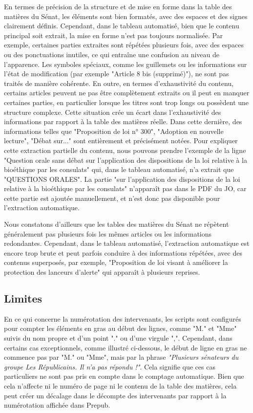 En termes de précision de la structure et de mise en forme dans la table des matières du Sénat, les éléments sont bien formatés, avec des espaces et des signes clairement définis. Cependant, dans le tableau automatisé, bien que le contenu principal soit extrait, la mise en forme n'est pas toujours normalisée. Par exemple, certaines parties extraites sont répétées plusieurs fois, avec des espaces ou des ponctuations inutiles, ce qui entraîne une confusion au niveau de l’apparence. Les symboles spéciaux, comme les guillemets ou les informations sur l'état de modification (par exemple "Article 8 bis (supprimé)"), ne sont pas traités de manière cohérente. En outre, en termes d'exhaustivité du contenu, certains articles peuvent ne pas être complètement extraits ou il peut en manquer certaines parties, en particulier lorsque les titres sont trop longs ou possèdent une structure complexe. Cette situation crée un écart dans l'exhaustivité des informations par rapport à la table des matières réelle. Dans cette dernière, des informations telles que "Proposition de loi n° 300", "Adoption en nouvelle lecture", "Débat sur..." sont entièrement et précisément notées. Pour expliquer cette extraction partielle du contenu, nous pouvons prendre l'exemple de la ligne "Question orale sans débat sur l'application des dispositions de la loi relative à la bioéthique par les consulats" qui, dans le tableau automatisé, n'a extrait que "QUESTIONS ORALES". La partie "sur l'application des dispositions de la loi relative à la bioéthique par les consulats" n'apparaît pas dans le PDF du JO, car cette partie est ajoutée manuellement, et n'est donc pas disponible pour l'extraction automatique.

Nous constatons d'ailleurs que les tables des matières du Sénat ne répètent généralement pas plusieurs fois les mêmes articles ou les informations redondantes. Cependant, dans le tableau automatisé, l'extraction automatique est encore trop brute et peut parfois conduire à des informations répétées, avec des contenus superposés, par exemple, "Proposition de loi visant à améliorer la protection des lanceurs d'alerte" qui apparaît à plusieurs reprises.


\subsection{Limites}

En ce qui concerne la numérotation des intervenants, les scripts sont configurés pour compter les éléments en gras au début des lignes, comme "M." et "Mme" suivis du nom propre et d'un point "." ou d'une virgule ",". Cependant, dans certains cas exceptionnels, comme illustré ci-dessous, le début de ligne en gras ne commence pas par "M." ou "Mme", mais par la phrase \textit{"Plusieurs sénateurs du groupe Les Républicains. Il n’a pas répondu !"}. Cela signifie que ces cas particuliers ne sont pas pris en compte dans le comptage automatique. Bien que cela n'affecte ni le numéro de page ni le contenu de la table des matières, cela peut créer un décalage dans le décompte des intervenants par rapport à la numérotation affichée dans \gls{Prepub}. 

